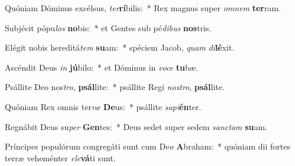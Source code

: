 \item Quóniam Dóminus excélsus, \textit{ter}\textbf{rí}bilis:~* Rex magnus super \textit{om}\textit{nem} \textbf{ter}ram.
\item Subjécit pópu\textit{los} \textbf{no}bis:~* et Gentes sub pé\textit{di}\textit{bus} \textbf{nos}tris.
\item Elégit nobis hereditá\textit{tem} \textbf{su}am:~* spéciem Jacob, \textit{quam} \textit{di}\textbf{lé}xit.
\item Ascéndit Deus \textit{in} \textbf{jú}bilo:~* et Dóminus in \textit{vo}\textit{ce} \textbf{tu}bæ.
\item Psállite Deo nos\textit{tro}, \textbf{psál}lite:~* psállite Regi \textit{nos}\textit{tro}, \textbf{psál}lite.
\item Quóniam Rex omnis ter\textit{ræ} \textbf{De}us:~* psállite \textit{sa}\textit{pi}\textbf{én}ter.
\item Regnábit Deus su\textit{per} \textbf{Gen}tes:~* Deus sedet super sedem \textit{sanc}\textit{tam} \textbf{su}am.
\item Príncipes populórum congregáti sunt cum De\textit{o} \textbf{A}braham:~* quóniam dii fortes terræ veheménter \textit{e}\textit{le}\textbf{vá}ti sunt.
